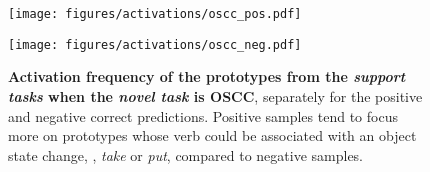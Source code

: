 \begin{figure}[t]
    \hfill
    \begin{minipage}{0.485\columnwidth}
        \texttt{[image: figures/activations/oscc\_pos.pdf]}
    \end{minipage}
    \hfill
    \begin{minipage}{0.485\columnwidth}
        \texttt{[image: figures/activations/oscc\_neg.pdf]}
    \end{minipage}
    \hfill
    \caption{\textbf{Activation frequency of the prototypes from the \emph{support tasks} when the \emph{novel task} is OSCC}, separately for the positive and negative correct predictions. Positive samples tend to focus more on prototypes whose verb could be associated with an object state change, \eg, \emph{take} or \emph{put}, compared to negative samples.
    }
    \label{fig:oscc_activations}
    \vspace{-0.3cm}
\end{figure}
